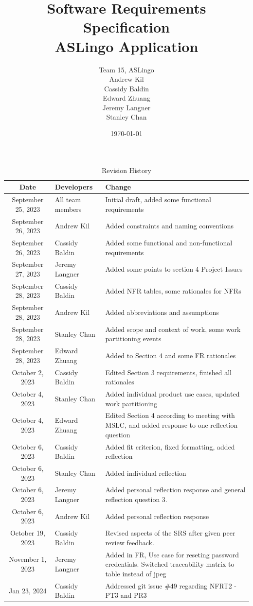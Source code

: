 \documentclass[12pt, titlepage]{article}
\title{Software Requirements Specification\\ASLingo Application}
\author{Team 15, ASLingo
		\\ Andrew Kil
		\\ Cassidy Baldin
		\\ Edward Zhuang
		\\ Jeremy Langner
		\\ Stanley Chan
}
\date{\today}
\begin{document}
\maketitle

\tableofcontents
\listoftables
\listoffigures

\newpage

\begin{longtable}{| c | p{3cm} | p{6.5cm} |}
\caption{Revision History} \\
\hline {\bf Date} & {\bf Developers} & {\bf Change}\\
\hline
September 25, 2023 & All team members & Initial draft, added some functional requirements \\
September 26, 2023 & Andrew Kil & Added constraints and naming conventions \\
September 26, 2023 & Cassidy Baldin & Added some functional and non-functional requirements \\
September 27, 2023 & Jeremy Langner & Added some points to section 4 Project Issues \\
September 28, 2023 & Cassidy Baldin & Added NFR tables, some rationales for NFRs \\
September 28, 2023 & Andrew Kil & Added abbreviations and assumptions \\
September 28, 2023 & Stanley Chan & Added scope and context of work, some work partitioning events \\
September 28, 2023 & Edward Zhuang & Added to Section 4 and some FR rationales \\
October 2, 2023 & Cassidy Baldin & Edited Section 3 requirements, finished all rationales \\
October 4, 2023 & Stanley Chan & Added individual product use cases, updated work partitioning \\
October 4, 2023 & Edward Zhuang & Edited Section 4 according to meeting with MSLC, and added response to one reflection question \\
October 6, 2023 & Cassidy Baldin & Added fit criterion, fixed formatting, added reflection \\
October 6, 2023 & Stanley Chan & Added individual reflection \\
October 6, 2023 & Jeremy Langner & Added personal reflection response and general reflection question 3. \\
October 6, 2023 & Andrew Kil & Added personal reflection response\\
October 19, 2023 & Cassidy Baldin & Revised aspects of the SRS after given peer review feedback. \\
November 1, 2023 & Jeremy Langner & Added in FR, Use case for reseting password credentials. Switched traceability matrix to table instead of jpeg\\
Jan 23, 2024 & Cassidy Baldin & Addressed git issue \#49 regarding NFRT2 - PT3 and PR3 \\
\bottomrule
\end{longtable}
\end{document}
